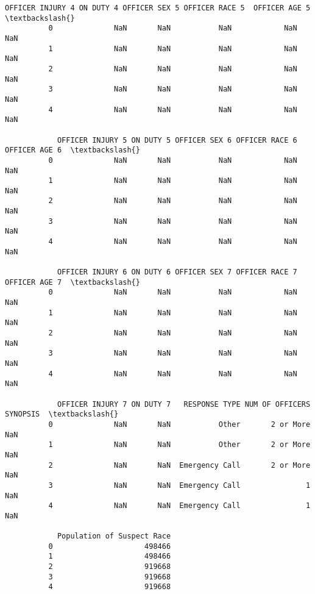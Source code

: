 \documentclass[11pt]{article}
\begin{document}
\begin{Verbatim}[commandchars=\\\{\}]
            OFFICER INJURY 4 ON DUTY 4 OFFICER SEX 5 OFFICER RACE 5  OFFICER AGE 5  \textbackslash{}
          0              NaN       NaN           NaN            NaN            NaN   
          1              NaN       NaN           NaN            NaN            NaN   
          2              NaN       NaN           NaN            NaN            NaN   
          3              NaN       NaN           NaN            NaN            NaN   
          4              NaN       NaN           NaN            NaN            NaN   
          
            OFFICER INJURY 5 ON DUTY 5 OFFICER SEX 6 OFFICER RACE 6  OFFICER AGE 6  \textbackslash{}
          0              NaN       NaN           NaN            NaN            NaN   
          1              NaN       NaN           NaN            NaN            NaN   
          2              NaN       NaN           NaN            NaN            NaN   
          3              NaN       NaN           NaN            NaN            NaN   
          4              NaN       NaN           NaN            NaN            NaN   
          
            OFFICER INJURY 6 ON DUTY 6 OFFICER SEX 7 OFFICER RACE 7  OFFICER AGE 7  \textbackslash{}
          0              NaN       NaN           NaN            NaN            NaN   
          1              NaN       NaN           NaN            NaN            NaN   
          2              NaN       NaN           NaN            NaN            NaN   
          3              NaN       NaN           NaN            NaN            NaN   
          4              NaN       NaN           NaN            NaN            NaN   
          
            OFFICER INJURY 7 ON DUTY 7   RESPONSE TYPE NUM OF OFFICERS SYNOPSIS  \textbackslash{}
          0              NaN       NaN           Other       2 or More      NaN   
          1              NaN       NaN           Other       2 or More      NaN   
          2              NaN       NaN  Emergency Call       2 or More      NaN   
          3              NaN       NaN  Emergency Call               1      NaN   
          4              NaN       NaN  Emergency Call               1      NaN   
          
            Population of Suspect Race  
          0                     498466  
          1                     498466  
          2                     919668  
          3                     919668  
          4                     919668  
\end{Verbatim}
            
\end{document}

